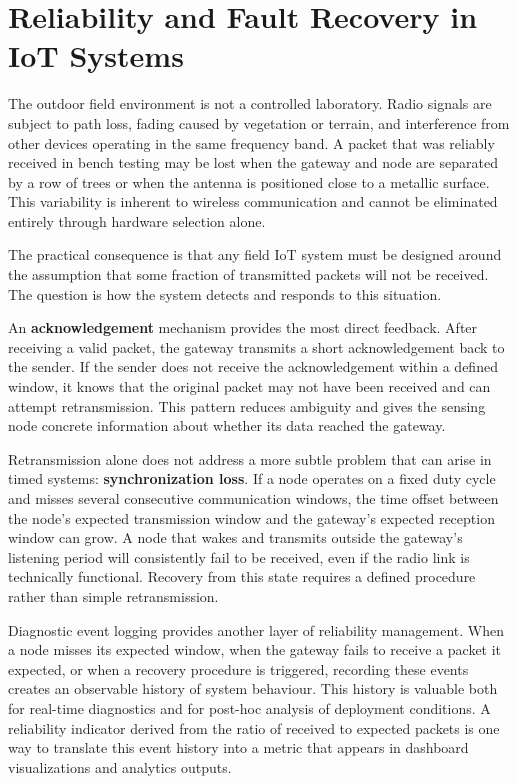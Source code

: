 \section{Reliability and Fault Recovery in IoT Systems}
\label{sec:reliability}

The outdoor field environment is not a controlled laboratory. Radio signals are
subject to path loss, fading caused by vegetation or terrain, and interference
from other devices operating in the same frequency band. A packet that was
reliably received in bench testing may be lost when the gateway and node are
separated by a row of trees or when the antenna is positioned close to a metallic
surface. This variability is inherent to wireless communication and cannot be
eliminated entirely through hardware selection alone.

The practical consequence is that any field IoT system must be designed around
the assumption that some fraction of transmitted packets will not be received.
The question is how the system detects and responds to this situation.

An \textbf{acknowledgement} mechanism provides the most direct feedback. After
receiving a valid packet, the gateway transmits a short acknowledgement back to
the sender. If the sender does not receive the acknowledgement within a defined
window, it knows that the original packet may not have been received and can
attempt retransmission. This pattern reduces ambiguity and gives the sensing node
concrete information about whether its data reached the gateway.

Retransmission alone does not address a more subtle problem that can arise in
timed systems: \textbf{synchronization loss}. If a node operates on a fixed duty
cycle and misses several consecutive communication windows, the time offset
between the node's expected transmission window and the gateway's expected
reception window can grow. A node that wakes and transmits outside the gateway's
listening period will consistently fail to be received, even if the radio link is
technically functional. Recovery from this state requires a defined procedure
rather than simple retransmission.

Diagnostic event logging provides another layer of reliability management. When
a node misses its expected window, when the gateway fails to receive a packet it
expected, or when a recovery procedure is triggered, recording these events
creates an observable history of system behaviour. This history is valuable both
for real-time diagnostics and for post-hoc analysis of deployment conditions.
A reliability indicator derived from the ratio of received to expected packets is
one way to translate this event history into a metric that appears in dashboard
visualizations and analytics outputs.

